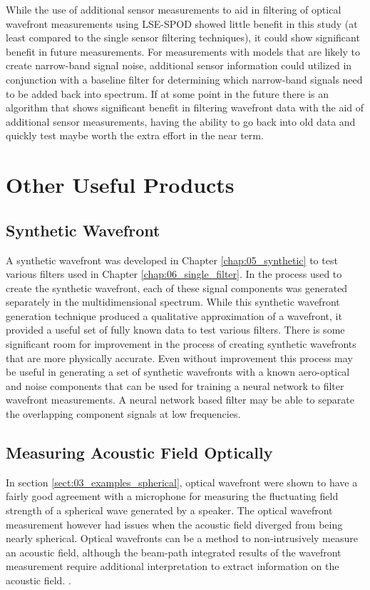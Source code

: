 While the use of additional sensor measurements to aid in filtering of optical wavefront measurements using LSE-SPOD showed little benefit in this study (at least compared to the single sensor filtering techniques), it could show significant benefit in future measurements.
For measurements with models that are likely to create narrow-band signal noise, additional sensor information could utilized in conjunction with a baseline filter for determining which narrow-band signals need to be added back into spectrum.
If at some point in the future there is an algorithm that shows significant benefit in filtering wavefront data with the aid of additional sensor measurements, having the ability to go back into old data and quickly test maybe worth the extra effort in the near term.

\section{Other Useful Products}

\subsection{Synthetic Wavefront}
A synthetic wavefront was developed in Chapter \ref{chap:05_synthetic} to test various filters used in Chapter \ref{chap:06_single_filter}.
In the process used to create the synthetic wavefront, each of these signal components was generated separately in the multidimensional spectrum.
While this synthetic wavefront generation technique produced a qualitative approximation of a wavefront, it provided a useful set of fully known data to test various filters.
There is some significant room for improvement in the process of creating synthetic wavefronts that are more physically accurate.
Even without improvement this process may be useful in generating a set of synthetic wavefronts with a known aero-optical and noise components that can be used for training a neural network to filter \cite{Lo-1994-W6aWeuaT} wavefront measurements.
A neural network based filter may be able to separate the overlapping component signals at low frequencies.

\subsection{Measuring Acoustic Field Optically}
In section \ref{sect:03_examples_spherical}, optical wavefront were shown to have a fairly good agreement with a microphone for measuring the fluctuating field strength of a spherical wave generated by a speaker.
The optical wavefront measurement however had issues when the acoustic field diverged from being nearly spherical.
Optical wavefronts can be a method to non-intrusively measure an acoustic field, although the beam-path integrated results of the wavefront measurement require additional interpretation to extract information on the acoustic field. .

